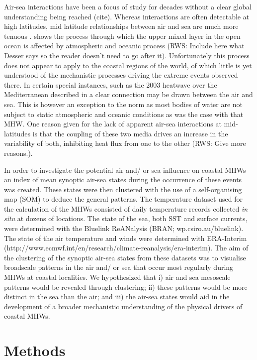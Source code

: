 \documentclass[a4paper,10pt,review]{elsarticle}
\begin{document}
Air-sea interactions have been a focus of study for decades \citep{Frankignoul1985} without a clear global understanding being reached (cite). Whereas interactions are often detectable at high latitudes, mid latitude relationships between air and sea are much more tenuous \citep{Krishnamurti1988}. \citet{Deser2010} shows the process through which the upper mixed layer in the open ocean is affected by atmospheric and oceanic process (RWS: Include here what Desser says so the reader doesn't need to go after it). Unfortunately this process does not appear to apply to the coastal regions of the world, of which little is yet understood of the mechanistic processes driving the extreme events observed there. In certain special instances, such as the 2003 heatwave over the Mediterranean described in \citet{Garrabou2009} a clear connection may be drawn between the air and sea. This is however an exception to the norm as most bodies of water are not subject to static atmospheric and oceanic conditions as was the case with that MHW. One reason given for the lack of apparent air-sea interactions at mid-latitudes is that the coupling of these two media drives an increase in the variability of both, inhibiting heat flux from one to the other \citep{Barsugli1998} (RWS: Give more reasons.).

In order to investigate the potential air and/ or sea influence on coastal MHWs an index of mean synoptic air-sea states during the occurrence of these events was created. These states were then clustered with the use of a self-organising map (SOM) to deduce the general patterns. The temperature dataset used for the calculation of the MHWs consisted of daily temperature records collected \emph{in situ} at dozens of locations. The state of the sea, both SST and surface currents, were determined with the Bluelink ReANalysis (BRAN; wp.csiro.au/bluelink). The state of the air temperature and winds were determined with ERA-Interim (http://www.ecmwf.int/en/research/climate-reanalysis/era-interim). The aim of the clustering of the synoptic air-sea states from these datasets was to visualise broadscale patterns in the air and/ or sea that occur most regularly during MHWs at coastal localities. We hypothesized that i) air and sea mesoscale patterns would be revealed through clustering; ii) these patterns would be more distinct in the sea than the air; and iii) the air-sea states would aid in the development of a broader mechanistic understanding of the physical drivers of coastal MHWs.

\section{Methods}
\end{document}
